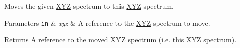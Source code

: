 Moves the given \hyperlink{structmage_1_1_x_y_z}{X\+YZ} spectrum to this \hyperlink{structmage_1_1_x_y_z}{X\+YZ} spectrum.


\begin{DoxyParams}[1]{Parameters}
\mbox{\tt in}  & {\em xyz} & A reference to the \hyperlink{structmage_1_1_x_y_z}{X\+YZ} spectrum to move. \\
\hline
\end{DoxyParams}
\begin{DoxyReturn}{Returns}
A reference to the moved \hyperlink{structmage_1_1_x_y_z}{X\+YZ} spectrum (i.\+e. this \hyperlink{structmage_1_1_x_y_z}{X\+YZ} spectrum). 
\end{DoxyReturn}
